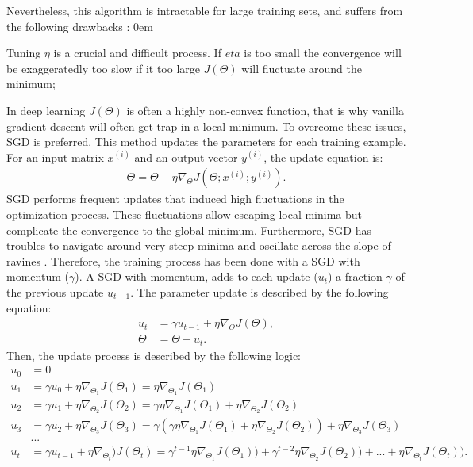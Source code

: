 \documentclass[12pt, french, a4paper]{article} %
\let\tempone\itemize
\let\temptwo\enditemize
\renewenvironment{itemize}{\tempone\addtolength{\itemsep}{-0.3\baselineskip}}{\temptwo}
\begin{document}
Nevertheless, this algorithm is intractable for large training sets, and suffers from the following drawbacks \cite{ruder2016overview}:
\begin{itemize}
\itemsep0em 
  \item Tuning $\eta$ is a crucial and difficult process. If $eta$ is too small the convergence will be exaggeratedly too slow if it too large $J(\Theta)$ will fluctuate around the minimum;
  \item In deep learning $J(\Theta)$ is often a highly non-convex function, that is why vanilla gradient descent will often get trap in a local minimum. 
\end{itemize}
To overcome these issues, \gls{SGD} is preferred. This method updates the parameters for each training example. For an input matrix $x^{(i)}$ and an output vector $y^{(i)}$, the update equation is:
\begin{align}
 \Theta = \Theta - \eta \nabla_\Theta J(\Theta;x^{(i)}; y^{(i)}).
\end{align}
SGD performs frequent updates that induced high fluctuations in the optimization process. These fluctuations allow escaping local minima but complicate the convergence to the global minimum. Furthermore, SGD has troubles to navigate around very steep minima and oscillate across the slope of ravines \cite{ruder2016overview}. Therefore, the training process has been done with a \gls{SGD} with momentum ($\gamma$). A \gls{SGD} with momentum, adds to each update ($u_t$) a fraction $\gamma$ of the previous update $u_{t-1}$. The parameter update is described by the following equation:
\begin{align}
 u_t &= \gamma u_{t-1} + \eta \nabla_\Theta J (\Theta),\\
 \Theta &= \Theta - u_t.
\end{align}
Then, the update process is described by the following logic:
\begin{align*}
 u_0 &= 0\\
 u_1 &= \gamma u_0 + \eta \nabla_{\Theta_1} J(\Theta_1) = \eta \nabla_{\Theta_1} J(\Theta_1)\\
 u_2& = \gamma u_1 + \eta \nabla_{\Theta_2} J(\Theta_2) = \gamma \eta \nabla_{\Theta_1}J(\Theta_1) + \eta \nabla_{\Theta_2}J(\Theta_2)\\
  u_3& = \gamma u_2 + \eta \nabla_{\Theta_3} J(\Theta_3) = \gamma(\gamma \eta \nabla_{\Theta_1} J(\Theta_1)+\eta \nabla_{\Theta_2} J(\Theta_2)) + \eta \nabla_{\Theta_3} J(\Theta_3)\\
  & ... \\
  u_t &= \gamma u_{t-1} + \eta \nabla_{\Theta_t}) J(\Theta_t) = \gamma^{t-1}\eta \nabla_{\Theta_1}J(\Theta_1)) + \gamma^{t-2}\eta \nabla_{\Theta_2}J(\Theta_2))+ ... + \eta \nabla_{\Theta_t}J(\Theta_t)).
\end{align*}
\end{document}
